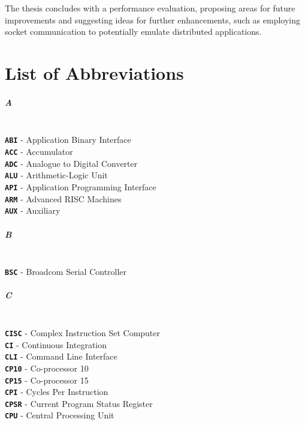\documentclass[english, ing, kiv, he, iso690numb, pdf]{fasthesis}
\begin{document}
	The thesis concludes with a performance evaluation, proposing areas for future improvements and suggesting ideas for further enhancements, such as employing socket communication to potentially emulate distributed applications.
	
	\backmatter
	
	\printbibliography
	
	\chapter{List of Abbreviations}
	
	\paragraph{A}
	\\
	\noindent
	\textbf{\texttt{ABI}} - Application Binary Interface \\
	\textbf{\texttt{ACC}} - Accumulator \\
	\textbf{\texttt{ADC}} - Analogue to Digital Converter \\
	\textbf{\texttt{ALU}} - Arithmetic-Logic Unit \\
	\textbf{\texttt{API}} - Application Programming Interface \\
	\textbf{\texttt{ARM}} - Advanced RISC Machines \\
	\textbf{\texttt{AUX}} - Auxiliary \\
	\paragraph{B}
	\\
	\noindent
	\textbf{\texttt{BSC}} - Broadcom Serial Controller \\
	\paragraph{C}
	\\
	\noindent
	\textbf{\texttt{CISC}} - Complex Instruction Set Computer \\
	\textbf{\texttt{CI}}   - Continuous Integration \\
	\textbf{\texttt{CLI}}  - Command Line Interface \\
	\textbf{\texttt{CP10}} - Co-processor 10 \\
	\textbf{\texttt{CP15}} - Co-processor 15 \\
	\textbf{\texttt{CPI}}  - Cycles Per Instruction \\
	\textbf{\texttt{CPSR}} - Current Program Status Register \\
	\textbf{\texttt{CPU}}  - Central Processing Unit \\
\end{document}
